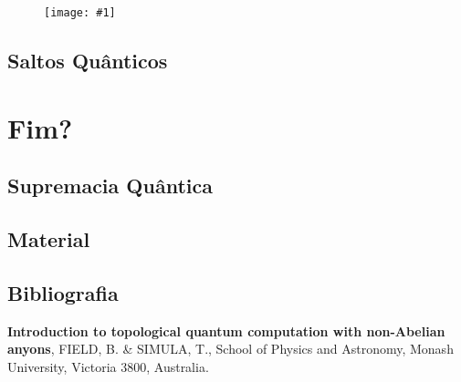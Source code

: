 \documentclass[t]{beamer}
\newcommand{\imgw}[2]{%
\begin{center}
	\begin{figure}
	\texttt{[image: \#1]}\\
	\end{figure}
\end{center}
}
\begin{document}
	\begin{frame}{\subsecname}
		\imgw{energy-levels.pdf}{7cm}
	\end{frame}
	
	\subsection{Saltos Quânticos}
	
	\begin{frame}
	
	\end{frame}	
	
	\section{Fim?}

	\subsection{Supremacia Quântica}
	
	\begin{frame}
	
	\end{frame}	
	
	\begin{frame}{\subsecname}
	
	\end{frame}
	
	\subsection{Material}
	
	\begin{frame}{\subsecname}
	
	\end{frame}
	
	\subsection{Bibliografia}
	
	\begin{frame}{\subsecname}
		
		 \textbf{Introduction to topological quantum computation with non-Abelian anyons}, FIELD, B. \& SIMULA, T., School of Physics and Astronomy, Monash University, Victoria 3800, Australia.
		
		\bibitem{}
	\end{frame}
\end{document}
